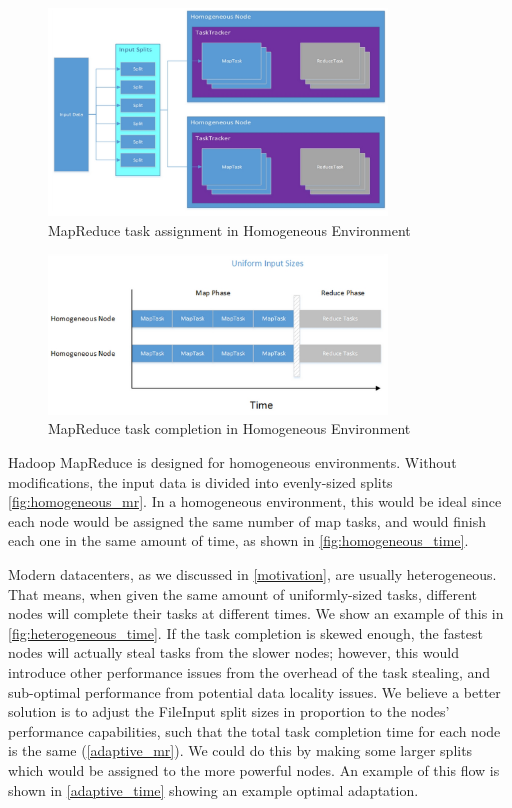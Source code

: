 \begin{figure}[ht!]
\centering
\includegraphics[width=90mm]{homogeneous_mr.jpg}
\caption{MapReduce task assignment in Homogeneous Environment}
\label{fig:homogeneoues_mr}
\end{figure}

\begin{figure}[ht!]
\centering
\includegraphics[width=90mm]{homogeneous_time.jpg}
\caption{MapReduce task completion in Homogeneous Environment}
\label{fig:homogeneoues_time}
\end{figure}

Hadoop MapReduce is designed for homogeneous environments. Without modifications, the input
data is divided into evenly-sized splits \ref{fig:homogeneous_mr}. In a homogeneous environment, 
this would be ideal since each node would be assigned the same number of map tasks, and would 
finish each one in the same amount of time, as shown in \ref{fig:homogeneous_time}. 

Modern datacenters, as we discussed in \ref{motivation}, are usually heterogeneous. That means,
when given the same amount of uniformly-sized tasks, different nodes will complete their tasks 
at different times. We show an example of this in \ref{fig:heterogeneous_time}. If the task completion
is skewed enough, the fastest nodes will actually steal tasks from the slower nodes; however,
this would introduce other performance issues from the overhead of the task stealing, and
sub-optimal performance from potential data locality issues. We believe a better solution is to
adjust the FileInput split sizes in proportion to the nodes' performance capabilities, such that
the total task completion time for each node is the same (\ref{adaptive_mr}). We could do this by making some larger
splits which would be assigned to the more powerful nodes. An example of this flow is shown in
\ref{adaptive_time} showing an example optimal adaptation.

